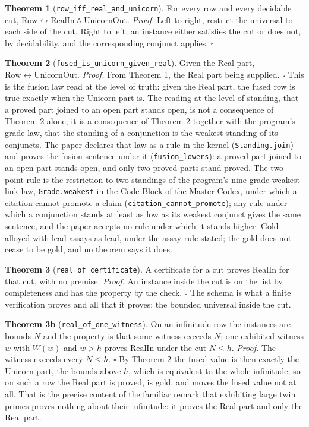 \documentclass[10pt]{article}
\begin{document}
\textbf{Theorem 1} (\texttt{row\_iff\_real\_and\_unicorn}). For every
row and every decidable cut,
\(\mathrm{Row} \leftrightarrow \mathrm{RealIn} \wedge \mathrm{UnicornOut}\).
\emph{Proof.} Left to right, restrict the universal to each side of the
cut. Right to left, an instance either satisfies the cut or does not, by
decidability, and the corresponding conjunct applies. \(\square\)

\textbf{Theorem 2} (\texttt{fused\_is\_unicorn\_given\_real}). Given the
Real part, \(\mathrm{Row} \leftrightarrow \mathrm{UnicornOut}\).
\emph{Proof.} From Theorem 1, the Real part being supplied. \(\square\)
This is the fusion law read at the level of truth: given the Real part,
the fused row is true exactly when the Unicorn part is. The reading at
the level of standing, that a proved part joined to an open part stands
open, is not a consequence of Theorem 2 alone; it is a consequence of
Theorem 2 together with the program's grade law, that the standing of a
conjunction is the weakest standing of its conjuncts. The paper declares
that law as a rule in the kernel (\texttt{Standing.join}) and proves the
fusion sentence under it (\texttt{fusion\_lowers}): a proved part joined
to an open part stands open, and only two proved parts stand proved. The
two-point rule is the restriction to two standings of the program's
nine-grade weakest-link law, \texttt{Grade.weakest} in the Code Block of
the Master Codex, under which a citation cannot promote a claim
(\texttt{citation\_cannot\_promote}); any rule under which a conjunction
stands at least as low as its weakest conjunct gives the same sentence,
and the paper accepts no rule under which it stands higher. Gold alloyed
with lead assays as lead, under the assay rule stated; the gold does not
cease to be gold, and no theorem says it does.

\textbf{Theorem 3} (\texttt{real\_of\_certificate}). A certificate for a
cut proves \(\mathrm{RealIn}\) for that cut, with no premise.
\emph{Proof.} An instance inside the cut is on the list by completeness
and has the property by the check. \(\square\) The schema is what a
finite verification proves and all that it proves: the bounded universal
inside the cut.

\textbf{Theorem 3b} (\texttt{real\_of\_one\_witness}). On an infinitude
row the instances are bounds \(N\) and the property is that some witness
exceeds \(N\); one exhibited witness \(w\) with \(W(w)\) and \(w > h\)
proves \(\mathrm{RealIn}\) under the cut \(N \le h\). \emph{Proof.} The
witness exceeds every \(N \le h\). \(\square\) By Theorem 2 the fused
value is then exactly the Unicorn part, the bounds above \(h\), which is
equivalent to the whole infinitude; so on such a row the Real part is
proved, is gold, and moves the fused value not at all. That is the
precise content of the familiar remark that exhibiting large twin primes
proves nothing about their infinitude: it proves the Real part and only
the Real part.
\end{document}

